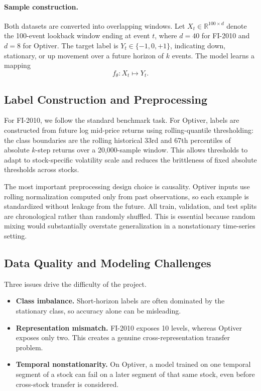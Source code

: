 \documentclass[11pt]{article}
\begin{document}
\paragraph{Sample construction.}
Both datasets are converted into overlapping windows. Let $X_t \in \mathbb{R}^{100 \times d}$ denote the 100-event lookback window ending at event $t$, where $d=40$ for FI-2010 and $d=8$ for Optiver. The target label is $Y_t \in \{-1,0,+1\}$, indicating down, stationary, or up movement over a future horizon of $k$ events. The model learns a mapping
\[
f_{\theta}: X_t \mapsto Y_t.
\]

\subsection{Label Construction and Preprocessing}
For FI-2010, we follow the standard benchmark task. For Optiver, labels are constructed from future log mid-price returns using rolling-quantile thresholding: the class boundaries are the rolling historical 33rd and 67th percentiles of absolute $k$-step returns over a 20{,}000-sample window. This allows thresholds to adapt to stock-specific volatility scale and reduces the brittleness of fixed absolute thresholds across stocks.

The most important preprocessing design choice is causality. Optiver inputs use rolling normalization computed only from past observations, so each example is standardized without leakage from the future. All train, validation, and test splits are chronological rather than randomly shuffled. This is essential because random mixing would substantially overstate generalization in a nonstationary time-series setting.

\subsection{Data Quality and Modeling Challenges}
Three issues drive the difficulty of the project.

\begin{itemize}
  \item \textbf{Class imbalance.} Short-horizon labels are often dominated by the stationary class, so accuracy alone can be misleading.
  \item \textbf{Representation mismatch.} FI-2010 exposes 10 levels, whereas Optiver exposes only two. This creates a genuine cross-representation transfer problem.
  \item \textbf{Temporal nonstationarity.} On Optiver, a model trained on one temporal segment of a stock can fail on a later segment of that same stock, even before cross-stock transfer is considered.
\end{itemize}
\end{document}
